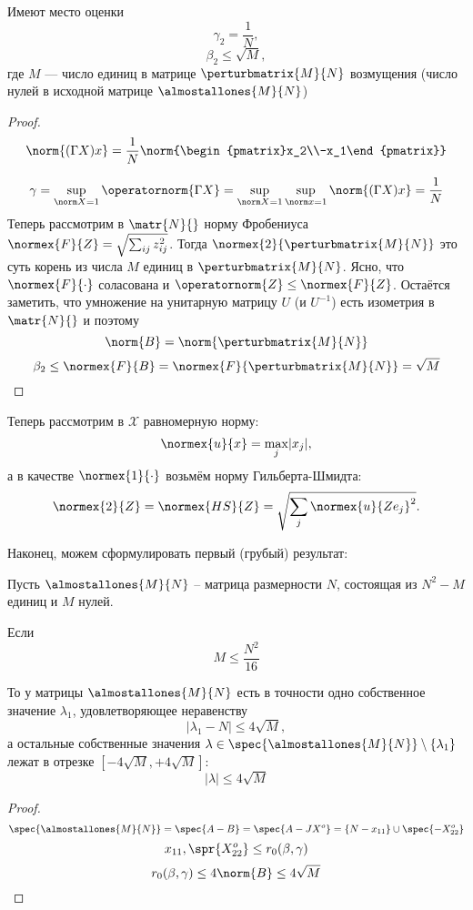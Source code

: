 \begin{lemma}
    Имеют место оценки
    \[ \gamma_2 = \frac1N ,\]
    \[ \beta_2 \leq \sqrt{M} ,\]
    где \( M \) --- число единиц в матрице \( \perturbmatrix{M}{N} \) возмущения
    (число нулей в исходной матрице \( \almostallones{M}{N} \))
\end{lemma}
\begin{proof}
    \[ \norm{(\Gamma X) x} = \frac1N \norm{\begin{pmatrix}x_2\\-x_1\end{pmatrix}} \]

    \[
        \gamma = \sup_{\norm X = 1} \operatornorm{\Gamma X}
        = \sup_{\norm X = 1} \sup_{\norm x = 1} \norm{(\Gamma X)x} = \frac1N
        \]
    Теперь рассмотрим в \( \matr{N}{} \) норму Фробениуса
    \( \normex{F}{Z} = \sqrt{\sum_{ij} z_{ij}^2} \).
    Тогда \( \normex{2}{\perturbmatrix{M}{N}} \)
    это суть корень из числа \( M \) единиц в \( \perturbmatrix{M}{N} \).
    Ясно, что \( \normex{F}{\cdot} \) соласована и \( \operatornorm{Z} \leq \normex{F}{Z} \).
    Остаётся заметить, что умножение на унитарную матрицу \( U \)
    (и \( U^{-1} \)) есть изометрия
    в \( \matr{N}{} \)
    и поэтому
    \[ \norm{B} = \norm{\perturbmatrix{M}{N}} \]
    \[ \beta_2 \leq \normex{F}{B} = \normex{F}{\perturbmatrix{M}{N}} = \sqrt{M} \]
\end{proof}

Теперь рассмотрим в \( \mathscr{X} \) равномерную норму:
\[ \normex{u}{x} = \max_j \lvert x_j \rvert, \]
а в качестве \( \normex{1}{\cdot} \) возьмём
норму Гильберта-Шмидта:
\[ \normex{2}{Z} = \normex{HS}{Z} = \sqrt{\sum_j \normex{u}{Z e_j}^2}. \]


Наконец, можем сформулировать первый (грубый) результат:
\begin{thm}
    Пусть \( \almostallones{M}{N} \) -- матрица размерности \( N \),
    состоящая из \( N^2 - M \) единиц и \( M \) нулей.

    Если
    \[
        M \leq \frac{N^2}{16}
        \]

    То у матрицы \( \almostallones{M}{N} \) есть в точности одно собственное
    значение \( \lambda_1 \), удовлетворяющее неравенству
    \[ \lvert \lambda_1 - N \rvert \leq 4\sqrt{M} ,\]
    а остальные собственные значения \( \lambda\in\spec{\almostallones{M}{N}} \setminus \{\lambda_1\} \)
    лежат в отрезке \( \left[-4\sqrt{M},+4\sqrt{M}\right] \):
    \[ \lvert \lambda \rvert \leq 4\sqrt{M} \]
\end{thm}
\begin{proof}
    \[
        \spec{\almostallones{M}{N}} = \spec{A-B} = \spec{A - JX^o}
        = \{ N - x_{11} \} \cup \spec{-X^o_{22}}
        \]
    \[ x_{11}, \spr{X^o_{22}} \leq r_0(\beta,\gamma) \]
    \[ r_0(\beta,\gamma) \leq 4\norm{B} \leq 4\sqrt{M} \]
\end{proof}
